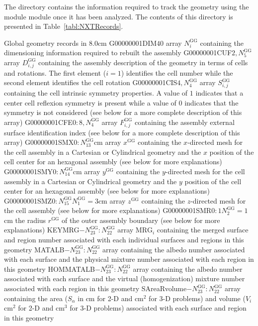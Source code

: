 The  directory contains the information required to track the geometry using the  module module once it has been analyzed. The contents of this directory is presented in Table~\ref{tabl:NXTRecords}.

\begin{DescriptionEnregistrement}{Global geometry records in }{8.0cm}\label{tabl:NXTRecords}
\IntEnr
  {G00000001DIM}{$40$}
  {array $N^{\text{GG}}_{i}$ containing the dimensioning information required to rebuilt the assembly} 
\IntEnr
  {G00000001CUF}{$2,N^{\text{GG}}_{5}$}
  {array $D^{\text{GG}}_{i,j}$ containing the assembly description of the geometry in terms of cells and rotations. The first element ($i=1$) identifies the cell number while the second element identifies the cell rotation} 
\IntEnr
  {G00000001CIS}{$4,N^{\text{GG}}_{4}$}
  {array $S^{\text{GG}}_{i,j}$ containing the cell intrinsic symmetry properties. A value of $1$ indicates that a center cell reflexion symmetry is present while a value of $0$ indicates that the symmetry is not considered (see below for a more complete description of this array)} 
\IntEnr
  {G00000001CFE}{$0:8,N^{\text{GG}}_{4}$}
  {array $F^{\text{GG}}_{i,j}$ containing the assembly external surface identification index (see below for a more complete description of this array)}
\DbleEnr
  {G00000001SMX}{$0:N^{\text{GG}}_{13}$}{cm}
  {array $x^{\text{GG}}$ containing the $x$-directed mesh for the cell assembly in a Cartesian or Cylindrical geometry and the $x$ position of the cell center for an hexagonal assembly (see below for more explanations)}
\DbleEnr
  {G00000001SMY}{$0:N^{\text{GG}}_{14}$}{cm}
  {array $y^{\text{GG}}$ containing the $y$-directed mesh for the cell assembly in a Cartesian or Cylindrical geometry and the $y$ position of the cell center for an hexagonal assembly (see below for more explanations)}
\OptDbleEnr
  {G00000001SMZ}{$0:N^{\text{GG}}_{15}$}{$N^{\text{GG}}_{1}=3$}{cm}
  {array $z^{\text{GG}}$ containing the $z$-directed mesh for the cell assembly (see below for more explanations)}
\OptDbleEnr
  {G00000001SMR}{$0:1$}{$N^{\text{GG}}_{2}=1$}{cm}
  {the radius $r^{\text{GG}}$ of the outer assembly boundary (see below for more explanations)}
\IntEnr
  {KEYMRG}{$-N^{\text{GG}}_{23}:N^{\text{GG}}_{22}$}
  {array $\text{MRG}_{i}$ containing the merged surface and region number associated with each individual surfaces and regions in this geometry}
\IntEnr
  {MATALB}{$-N^{\text{GG}}_{23}:N^{\text{GG}}_{22}$}
  {array containing the albedo number associated with each surface and the physical mixture number associated with each region in this geometry}
\IntEnr
  {HOMMATALB}{$-N^{\text{GG}}_{23}:N^{\text{GG}}_{22}$}
  {array containing the albedo number associated with each surface and the virtual (homogenization) mixture number associated with each region in this geometry}
\DbleEnr
  {SAreaRvolume}{$-N^{\text{GG}}_{23}:N^{\text{GG}}_{22}$}{}
  {array containing the area ($S_{\alpha}$ in cm for 2-D and cm$^{2}$ for 3-D problems) and volume ($V_{i}$ cm$^{2}$ for 2-D and
cm$^{3}$ for 3-D problems) associated with each surface and region in this geometry}
\end{DescriptionEnregistrement}

